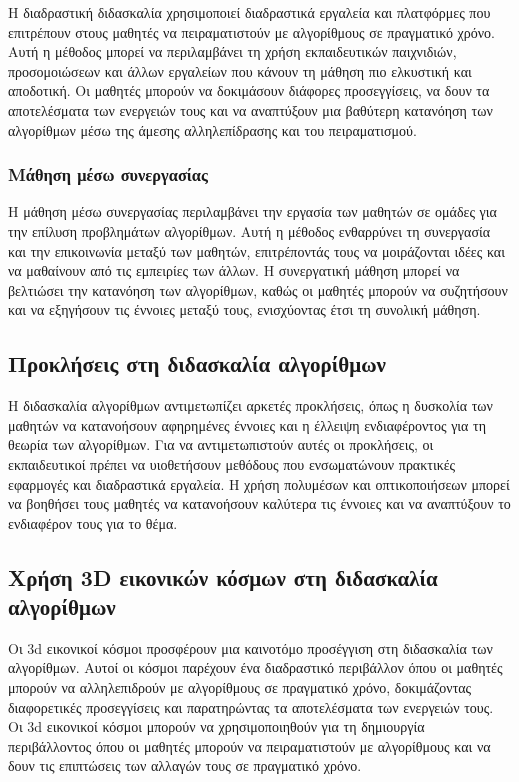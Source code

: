 Η διαδραστική διδασκαλία χρησιμοποιεί διαδραστικά εργαλεία και πλατφόρμες που επιτρέπουν στους μαθητές να πειραματιστούν με αλγορίθμους σε πραγματικό χρόνο. Αυτή η μέθοδος μπορεί να περιλαμβάνει τη χρήση εκπαιδευτικών παιχνιδιών, προσομοιώσεων και άλλων εργαλείων που κάνουν τη μάθηση πιο ελκυστική και αποδοτική. Οι μαθητές μπορούν να δοκιμάσουν διάφορες προσεγγίσεις, να δουν τα αποτελέσματα των ενεργειών τους και να αναπτύξουν μια βαθύτερη κατανόηση των αλγορίθμων μέσω της άμεσης αλληλεπίδρασης και του πειραματισμού\cite{__2022}.

\subsubsection{Μάθηση μέσω συνεργασίας}

Η μάθηση μέσω συνεργασίας περιλαμβάνει την εργασία των μαθητών σε ομάδες για την επίλυση προβλημάτων αλγορίθμων. Αυτή η μέθοδος ενθαρρύνει τη συνεργασία και την επικοινωνία μεταξύ των μαθητών, επιτρέποντάς τους να μοιράζονται ιδέες και να μαθαίνουν από τις εμπειρίες των άλλων. Η συνεργατική μάθηση μπορεί να βελτιώσει την κατανόηση των αλγορίθμων, καθώς οι μαθητές μπορούν να συζητήσουν και να εξηγήσουν τις έννοιες μεταξύ τους, ενισχύοντας έτσι τη συνολική μάθηση\cite{crepinsek_note_2012}.


\subsection{Προκλήσεις στη διδασκαλία αλγορίθμων}

Η διδασκαλία αλγορίθμων αντιμετωπίζει αρκετές προκλήσεις, όπως η δυσκολία των μαθητών να κατανοήσουν αφηρημένες έννοιες και η έλλειψη ενδιαφέροντος για τη θεωρία των αλγορίθμων. Για να αντιμετωπιστούν αυτές οι προκλήσεις, οι εκπαιδευτικοί πρέπει να υιοθετήσουν μεθόδους που ενσωματώνουν πρακτικές εφαρμογές και διαδραστικά εργαλεία. Η χρήση πολυμέσων και οπτικοποιήσεων μπορεί να βοηθήσει τους μαθητές να κατανοήσουν καλύτερα τις έννοιες και να αναπτύξουν το ενδιαφέρον τους για το θέμα\cite{__2017}.


\subsection{Χρήση 3D εικονικών κόσμων στη διδασκαλία αλγορίθμων}

Οι \acrshort{3d} εικονικοί κόσμοι προσφέρουν μια καινοτόμο προσέγγιση στη διδασκαλία των αλγορίθμων. Αυτοί οι κόσμοι παρέχουν ένα διαδραστικό περιβάλλον όπου οι μαθητές μπορούν να αλληλεπιδρούν με αλγορίθμους σε πραγματικό χρόνο, δοκιμάζοντας διαφορετικές προσεγγίσεις και παρατηρώντας τα αποτελέσματα των ενεργειών τους. Οι \acrshort{3d} εικονικοί κόσμοι μπορούν να χρησιμοποιηθούν για τη δημιουργία περιβάλλοντος όπου οι μαθητές μπορούν να πειραματιστούν με αλγορίθμους και να δουν τις επιπτώσεις των αλλαγών τους σε πραγματικό χρόνο\cite{crepinsek_note_2012}.

